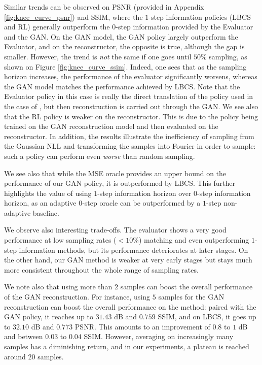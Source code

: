 Similar trends can be observed on PSNR (provided in Appendix \ref{fig:knee_curve_psnr}) and SSIM, where the $1$-step information policies (LBCS and RL) generally outperform the $0$-step information provided by the Evaluator and the GAN. On the GAN model, the GAN policy largely outperform the Evaluator, and on the reconstructor, the opposite is true, although the gap is smaller. However, the trend is \textit{not} the same if one goes until $50\%$ sampling, as shown on Figure \ref{fig:knee_curve_ssim}. Indeed, one sees that as the sampling horizon increases, the performance of the evaluator significantly worsens, whereas the GAN model matches the performance achieved by LBCS. Note that the Evaluator policy in this case is really the direct translation of the policy used in the case of \citet{zhang2019reducing}, but then reconstruction is carried out through the GAN. We see also that the RL policy is weaker on the reconstructor. This is due to the policy being trained on the GAN reconstruction model and then evaluated on the reconstructor. In addition, the results illustrate the inefficiency of sampling from the Gaussian NLL and transforming the samples into Fourier in order to sample: such a policy can perform even \textit{worse} than random sampling. %

We see also that while the MSE oracle provides an upper bound on the performance of our GAN policy, it is outperformed by LBCS. This further highlights the value of using $1$-step information horizon over $0$-step information horizon, as an adaptive $0$-step oracle can be outperformed by a $1$-step non-adaptive baseline. 

 

We observe also interesting trade-offs. The evaluator shows a very good performance at low sampling rates ($<10\%$) matching and even outperforming $1$-step information methods, but its performance deteriorates at later stages. On the other hand, our GAN method is weaker at very early stages but stays much more consistent throughout the whole range of sampling rates. 

We note also that using more than $2$ samples can boost the overall performance of the GAN reconstruction. For instance, using $5$ samples for the GAN reconstruction can boost the overall performance on the method: paired with the GAN policy, it reaches up to $31.43$ dB and $0.759$ SSIM, and on LBCS, it goes up to $32.10$ dB and $0.773$ PSNR. This amounts to an improvement of $0.8$ to $1$ dB and between $0.03$ to $0.04$ SSIM. However, averaging on increasingly many samples has a diminishing return, and in our experiments, a plateau is reached around $20$ samples. 

